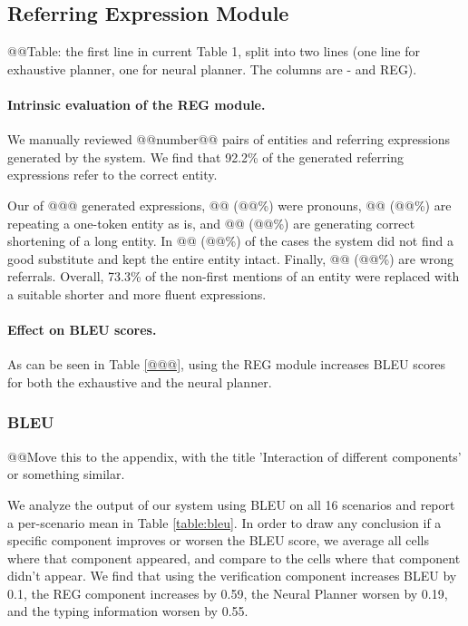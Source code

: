 \subsection{Referring Expression Module}
\label{eval:reg}
@@Table: the first line in current Table 1, split into two lines (one line for exhaustive planner, one for neural planner. The columns are - and REG).

\paragraph{Intrinsic evaluation of the REG module.}
We manually reviewed @@number@@ pairs of entities and referring expressions generated by the system.
We find that 92.2\% of the generated referring expressions refer to the correct entity.

Our of @@@ generated expressions, @@ (@@\%) were pronouns, @@ (@@\%) are repeating a one-token entity as is, and @@ (@@\%) are generating correct shortening of a long entity. In @@ (@@\%) of the cases the system did not find a good substitute and kept the entire entity intact. Finally, @@ (@@\%) are wrong referrals. Overall, 73.3\% of the non-first mentions of an entity were replaced with a suitable shorter and more fluent expressions.  

\paragraph{Effect on BLEU scores.}
As can be seen in Table \ref{@@@}, using the REG module increases BLEU scores for both the exhaustive and the neural planner.


\subsubsection{BLEU}
@@Move this to the appendix, with the title 'Interaction of different components' or something similar.

We analyze the output of our system using BLEU \cite{papineni2002bleu} on all 16 scenarios and report a per-scenario mean in Table \ref{table:bleu}.
In order to draw any conclusion if a specific component improves or worsen the BLEU score, we average all cells where that component appeared, and compare to the cells where that component didn't appear.
We find that using the verification component increases BLEU by 0.1, the REG component increases by 0.59, the Neural Planner worsen by 0.19, and the typing information worsen by 0.55.





